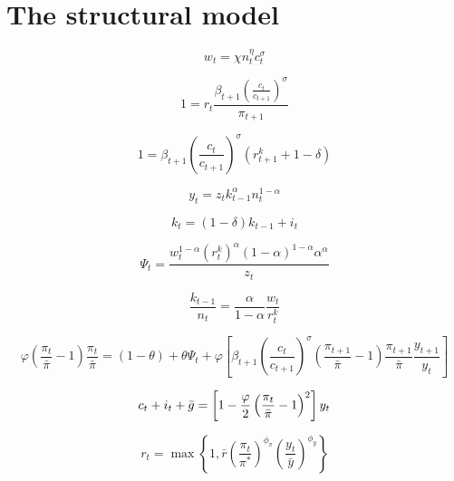 \documentclass{article}
\begin{document}
\section{The structural model}

\begin{equation}
w_{t}=\chi n_{t}^{\eta }c_{t}^{\sigma }
\end{equation}

\begin{equation}
1=r_{t}\frac{\beta _{t+1}\left( \frac{c_{t}}{c_{t+1}}\right) ^{\sigma }}{\pi
_{t+1}}
\end{equation}

\begin{equation}
1=\beta _{t+1}\left( \frac{c_{t}}{c_{t+1}}\right) ^{\sigma }\left(
r_{t+1}^{k}+1-\delta \right)
\end{equation}

\begin{equation}
y_{t}=z_{t}k_{t-1}^{\alpha }n_{t}^{1-\alpha }
\end{equation}

\begin{equation}
k_{t}=\left( 1-\delta \right) k_{t-1}+i_{t}
\end{equation}

\begin{equation}
\Psi _{t}=\frac{w_{t}^{1-\alpha }\left( r_{t}^{k}\right) ^{\alpha }\left(
1-\alpha \right) ^{1-\alpha }\alpha ^{\alpha }}{z_{t}}
\end{equation}

\begin{equation}
\frac{k_{t-1}}{n_{t}}=\frac{\alpha }{1-\alpha }\frac{w_{t}}{r_{t}^{k}}
\end{equation}

\begin{equation}
\varphi \left( \frac{\pi _{t}}{\bar{\pi}}-1\right) \frac{\pi _{t}}{\bar{\pi}}%
=\left( 1-\theta \right) +\theta \Psi _{t}+\varphi \left[ \beta _{t+1}\left( 
\frac{c_{t}}{c_{t+1}}\right) ^{\sigma }\left( \frac{\pi _{t+1}}{\bar{\pi}}%
-1\right) \frac{\pi _{t+1}}{\bar{\pi}}\frac{y_{t+1}}{y_{t}}\right]
\end{equation}

\begin{equation}
c_{t}+i_{t}+\bar{g}=\left[ 1-\frac{\varphi }{2}\left( \frac{\pi _{t}}{\bar{%
\pi}}-1\right) ^{2}\right] y_{t}
\end{equation}

\begin{equation}
r_{t}=\max \left\{ 1,\bar{r}\left( \frac{\pi _{t}}{\pi ^{\ast }}\right)
^{\phi _{\pi }}\left( \frac{y_{t}}{\bar{y}}\right) ^{\phi _{y}}\right\}
\end{equation}
\end{document}
